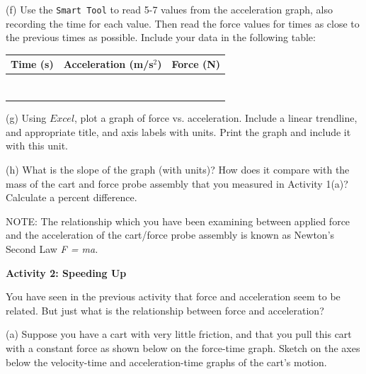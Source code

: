 \newpage

(f) Use the {\tt Smart Tool} to read 5-7 values from the acceleration graph, 
also recording the time for each value. Then read the force values for times 
as close to the previous times as possible. Include your data in the following 
table:

\vspace{10mm}

{\centering \begin{tabular}{|c|c|c|}
\hline
Time (s)&
Acceleration (m/s\( ^{2} \))&
Force (N)\\
\hline
&
&
\\
\hline
&
&
\\
\hline
&
&
\\
\hline
&
&
\\
\hline
&
&
\\
\hline
&
&
\\
\hline
&
&
\\
\hline
\end{tabular}\par}
\vspace{10mm}

(g) Using $Excel$, plot a graph of force vs. acceleration. Include a linear 
trendline, and appropriate title, and axis labels with units. Print the graph 
and include it with this unit.
\vspace{10mm}

(h) What is the slope of the graph (with units)? How does it compare with the 
mass of the cart and force probe assembly that you measured in Activity 1(a)?
 Calculate a percent difference.
\vspace{50mm}

NOTE: The relationship which you have been examining between applied force and 
the acceleration of the cart/force probe assembly is known as Newton's Second 
Law \textit{F = ma.}

\newpage


\textbf{Activity 2: Speeding Up }

You have seen in the previous activity that force and acceleration seem to be
related. But just what is the relationship between force and acceleration? 

(a) Suppose you have a cart with very little friction, and that you pull this
cart with a constant force as shown below on the force-time graph. Sketch on
the axes below the velocity-time and acceleration-time graphs of the cart's
motion.

